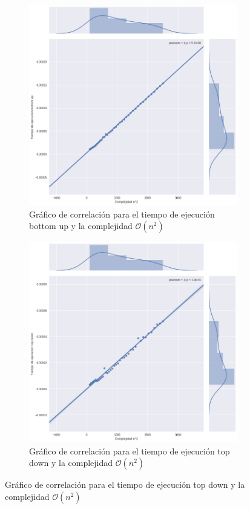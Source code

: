 \documentclass[a4paper]{report}
\begin{document}
\begin{figure}[h!]
    \begin{subfigure}{0.5\textwidth}
    \includegraphics[width=1.0\textwidth]{pearsonBottom.png}
        \caption{Gráfico de correlación para el tiempo de ejecución bottom up y la complejidad $\mathcal{O}(n^2)$}
    \end{subfigure}
    \begin{subfigure}{0.5\textwidth}
        \includegraphics[width=1.0\linewidth]{pearsonTopdown.png}
        \caption{Gráfico de correlación para el tiempo de ejecución top down y la complejidad $\mathcal{O}(n^2)$}    
    \end{subfigure}
\end{figure}
\end{document}
